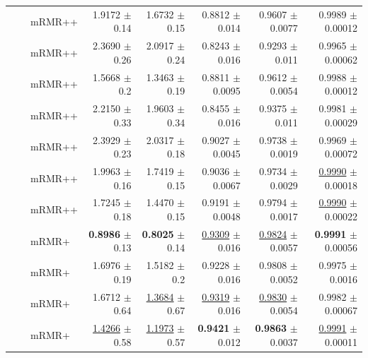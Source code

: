 \begin{longtable}{llp{}rrrrr}
 &  & mRMR++ & 1.9172 {\scriptsize $\pm$ 0.14} & 1.6732 {\scriptsize $\pm$ 0.15} & 0.8812 {\scriptsize $\pm$ 0.014} & 0.9607 {\scriptsize $\pm$ 0.0077} & 0.9989 {\scriptsize $\pm$ 0.00012} \\
 &  & mRMR++ & 2.3690 {\scriptsize $\pm$ 0.26} & 2.0917 {\scriptsize $\pm$ 0.24} & 0.8243 {\scriptsize $\pm$ 0.016} & 0.9293 {\scriptsize $\pm$ 0.011} & 0.9965 {\scriptsize $\pm$ 0.00062} \\
 &  & mRMR++ & 1.5668 {\scriptsize $\pm$ 0.2} & 1.3463 {\scriptsize $\pm$ 0.19} & 0.8811 {\scriptsize $\pm$ 0.0095} & 0.9612 {\scriptsize $\pm$ 0.0054} & 0.9988 {\scriptsize $\pm$ 0.00012} \\
 &  & mRMR++ & 2.2150 {\scriptsize $\pm$ 0.33} & 1.9603 {\scriptsize $\pm$ 0.34} & 0.8455 {\scriptsize $\pm$ 0.016} & 0.9375 {\scriptsize $\pm$ 0.011} & 0.9981 {\scriptsize $\pm$ 0.00029} \\
 &  & mRMR++ & 2.3929 {\scriptsize $\pm$ 0.23} & 2.0317 {\scriptsize $\pm$ 0.18} & 0.9027 {\scriptsize $\pm$ 0.0045} & 0.9738 {\scriptsize $\pm$ 0.0019} & 0.9969 {\scriptsize $\pm$ 0.00072} \\
 &  & mRMR++ & 1.9963 {\scriptsize $\pm$ 0.16} & 1.7419 {\scriptsize $\pm$ 0.15} & 0.9036 {\scriptsize $\pm$ 0.0067} & 0.9734 {\scriptsize $\pm$ 0.0029} & \underline{0.9990} {\scriptsize $\pm$ 0.00018} \\
 &  & mRMR++ & 1.7245 {\scriptsize $\pm$ 0.18} & 1.4470 {\scriptsize $\pm$ 0.15} & 0.9191 {\scriptsize $\pm$ 0.0048} & 0.9794 {\scriptsize $\pm$ 0.0017} & \underline{0.9990} {\scriptsize $\pm$ 0.00022} \\
 &  & mRMR+ & \textbf{0.8986} {\scriptsize $\pm$ 0.13} & \textbf{0.8025} {\scriptsize $\pm$ 0.14} & \underline{0.9309} {\scriptsize $\pm$ 0.016} & \underline{0.9824} {\scriptsize $\pm$ 0.0057} & \textbf{0.9991} {\scriptsize $\pm$ 0.00056} \\
 &  & mRMR+ & 1.6976 {\scriptsize $\pm$ 0.19} & 1.5182 {\scriptsize $\pm$ 0.2} & 0.9228 {\scriptsize $\pm$ 0.016} & 0.9808 {\scriptsize $\pm$ 0.0052} & 0.9975 {\scriptsize $\pm$ 0.0016} \\
 &  & mRMR+ & 1.6712 {\scriptsize $\pm$ 0.64} & \underline{1.3684} {\scriptsize $\pm$ 0.67} & \underline{0.9319} {\scriptsize $\pm$ 0.016} & \underline{0.9830} {\scriptsize $\pm$ 0.0054} & 0.9982 {\scriptsize $\pm$ 0.00067} \\
 &  & mRMR+ & \underline{1.4266} {\scriptsize $\pm$ 0.58} & \underline{1.1973} {\scriptsize $\pm$ 0.57} & \textbf{0.9421} {\scriptsize $\pm$ 0.012} & \textbf{0.9863} {\scriptsize $\pm$ 0.0037} & \underline{0.9991} {\scriptsize $\pm$ 0.00011} \\

\end{longtable}

